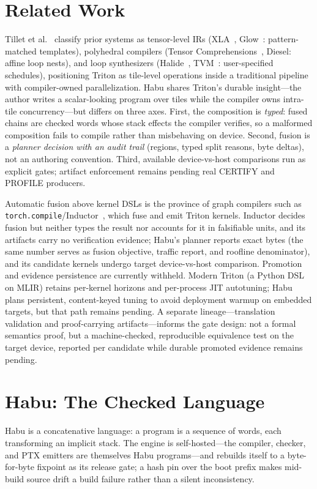 \documentclass[11pt]{article}
\newcommand{\code}[1]{\texttt{#1}}
\begin{document}
\section{Related Work}\label{sec:related}
Tillet et al.~\cite{triton} classify prior systems as tensor-level IRs
(XLA~\cite{xla}, Glow~\cite{glow}: pattern-matched templates), polyhedral compilers
(Tensor Comprehensions~\cite{tc}, Diesel: affine loop nests), and loop
synthesizers (Halide~\cite{halide}, TVM~\cite{tvm}: user-specified
schedules), positioning Triton as tile-level operations inside a
traditional pipeline with compiler-owned parallelization. Habu shares
Triton's durable insight---the author writes a scalar-looking program over
tiles while the compiler owns intra-tile concurrency---but differs on
three axes. First, the composition is \emph{typed}: fused chains are
checked words whose stack effects the compiler verifies, so a malformed
composition fails to compile rather than misbehaving on device. Second,
fusion is a \emph{planner decision with an audit trail} (regions, typed
split reasons, byte deltas), not an authoring convention. Third, available
device-vs-host comparisons run as explicit gates; artifact enforcement
remains pending real CERTIFY and PROFILE producers.

Automatic fusion above kernel DSLs is the province of graph compilers such
as \code{torch.compile}/Inductor~\cite{pytorch2}, which fuse and emit
Triton kernels. Inductor decides fusion but neither types the result nor
accounts for it in falsifiable units, and its artifacts carry no
verification evidence; Habu's planner reports exact bytes (the same number
serves as fusion objective, traffic report, and roofline denominator), and
its candidate kernels undergo target device-vs-host comparison. Promotion
and evidence persistence are currently withheld. Modern Triton (a Python
DSL on MLIR) retains per-kernel horizons and per-process JIT autotuning;
Habu plans persistent, content-keyed tuning to avoid deployment warmup on
embedded targets, but that path remains pending. A separate
lineage---translation validation and proof-carrying artifacts---informs the
gate design: not a formal semantics proof, but a machine-checked,
reproducible equivalence test on the target device, reported per candidate
while durable promoted evidence remains pending.

\section{Habu: The Checked Language}\label{sec:lang}
Habu is a concatenative language: a program is a sequence of words, each
transforming an implicit stack. The engine is self-hosted---the compiler,
checker, and PTX emitters are themselves Habu programs---and rebuilds
itself to a byte-for-byte fixpoint as its release gate; a hash pin over the
boot prefix makes mid-build source drift a build failure rather than a
silent inconsistency.
\end{document}
